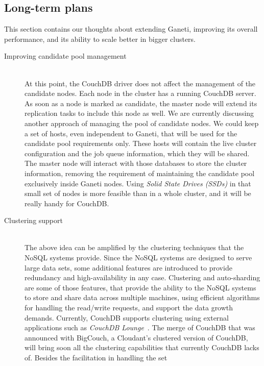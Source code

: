 \subsection{Long-term plans}

This section contains our thoughts about extending Ganeti, improving its
overall performance, and its ability to scale better in bigger clusters.

\begin{description}
  \item[Improving candidate pool management] \hfill \\
    At this point, the CouchDB driver does not affect the management of the
    candidate nodes. Each node in the cluster has a running CouchDB server. As
    soon as a node is marked as candidate, the master node will extend its
    replication tasks to include this node as well. We are currently discussing
    another approach of managing the pool of candidate nodes. We could keep a
    set of hosts, even independent to Ganeti, that will be used for the
    candidate pool requirements only. These hosts will contain the live cluster
    configuration and the job queue information, which they will be shared. The
    master node will interact with those databases to store the cluster
    information, removing the requirement of maintaining the candidate pool
    exclusively inside Ganeti nodes. Using \emph{Solid State Drives (SSDs)}
    in that small set of nodes is more feasible than in a whole cluster, and it
    will be really handy for CouchDB.
  \item[Clustering support] \hfill \\
    The above idea can be amplified by the clustering techniques that the NoSQL
    systems provide. Since the NoSQL systems are designed to serve large data
    sets, some additional features are introduced to provide redundancy and
    high-availability in any case. Clustering and auto-sharding are some of
    those features, that provide the ability to the NoSQL systems to store and
    share data across multiple machines, using efficient algorithms for handling
    the read/write requests, and support the data growth demands. Currently,
    CouchDB supports clustering using external applications such as
    \emph{CouchDB Lounge}~. The
    merge of CouchDB that was announced with BigCouch, a Cloudant's clustered
    version of CouchDB, will bring soon all the clustering capabilities that
    currently CouchDB lacks of. Besides the facilitation in handling the set

\end{description}
